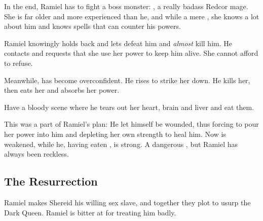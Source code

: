 In the end, Ramiel has to fight a boss monster: 
\Matriarch{} , a really badass Redcor mage. 
She is far older and more experienced than he, and while a mere \human, she knows a lot about him and knows spells that can counter his \resphan{} powers. 

Ramiel knowingly holds back and lets \Dominice{} defeat him and \emph{almost} kill him. 
He contacts \Belzir{} and requests that she use her power to keep him alive. 
She cannot afford to refuse. 

Meanwhile, \Dominice{} has become overconfident. 
He rises to strike her down. 
He kills her, then eats her and absorbs her power. 

Have a bloody scene where he tears out her heart, brain and liver and eat them. 

This was a part of Ramiel's plan: 
He let himself be wounded, thus forcing \Belzir{} to pour her power into him and depleting her own strength to heal him. 
Now \Belzir{} is weakened, while he, having eaten \Dominice, is strong.
A dangerous , but Ramiel has always been reckless. 












\subsection{The Resurrection} 
Ramiel makes Shereid his willing sex slave, and together they plot to usurp the Dark Queen. 
Ramiel is bitter at \Belzir{} for treating him badly. 


